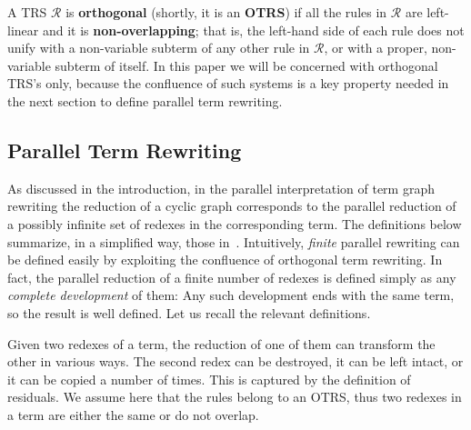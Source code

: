 \documentclass{eptcs}
\theoremstyle{plain}
\theoremstyle{definition}
\begin{document}
A TRS $\mathcal{R}$ is {\bf orthogonal} (shortly, it is an {\bf OTRS}) 
if all the rules in $\mathcal{R}$ are 
left-linear and it is {\bf non-overlapping}; that is, the 
left-hand 
side of each rule does not unify with a non-variable subterm 
of 
any other rule in $\mathcal{R}$, or with a proper, non-variable subterm
of itself. In this paper we will be concerned  
with orthogonal TRS's only, because the confluence of such 
systems is a key property needed in the next section to 
define    parallel term rewriting.

\subsection{Parallel Term Rewriting}

As discussed in the introduction, in the parallel interpretation of
term graph rewriting the reduction of a cyclic graph corresponds to 
the parallel reduction of a possibly infinite set of redexes 
in the corresponding term. 
The definitions below summarize, in a simplified way, those in~\cite{Cor:TRC}.
Intuitively, {\em finite} parallel rewriting can be defined easily by 
exploiting the confluence of orthogonal term rewriting. In fact, 
the parallel reduction of a finite number of redexes is defined simply 
as any 
{\em complete development} of them: Any such development ends with the 
same term, so the result is well defined. Let us recall the relevant 
definitions.
  
Given two redexes of a term, the reduction of one of them can 
transform 
the other in various ways. 
The second redex can be destroyed, it can be left intact, or it can be 
copied a 
number of times. This is captured by the definition of residuals. We 
assume here that the rules belong to an OTRS, thus two redexes in a 
term 
are either the same or do not overlap. 
\end{document}

